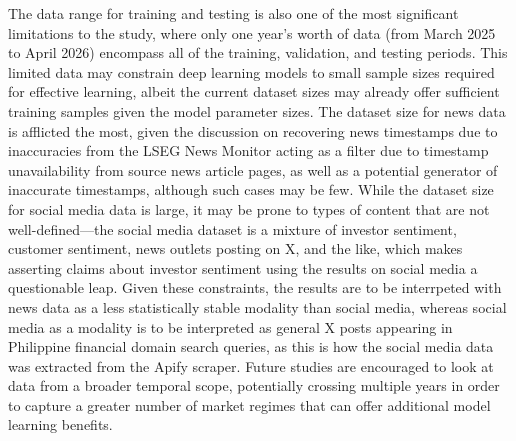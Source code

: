 \documentclass[stu,floatsintext]{apa7}
\begin{document}
The data range for training and testing is also one of the most significant limitations to the study, where only one year's worth of data (from March 2025 to April 2026) encompass all of the training, validation, and testing periods. This limited data may constrain deep learning models to small sample sizes required for effective learning, albeit the current dataset sizes may already offer sufficient training samples given the model parameter sizes. The dataset size for news data is afflicted the most, given the discussion on recovering news timestamps due to inaccuracies from the LSEG News Monitor acting as a filter due to timestamp unavailability from source news article pages, as well as a potential generator of inaccurate timestamps, although such cases may be few. While the dataset size for social media data is large, it may be prone to types of content that are not well-defined—the social media dataset is a mixture of investor sentiment, customer sentiment, news outlets posting on X, and the like, which makes asserting claims about investor sentiment using the results on social media a questionable leap. Given these constraints, the results are to be interrpeted with news data as a less statistically stable modality than social media, whereas social media as a modality is to be interpreted as general X posts appearing in Philippine financial domain search queries, as this is how the social media data was extracted from the Apify scraper. Future studies are encouraged to look at data from a broader temporal scope, potentially crossing multiple years in order to capture a greater number of market regimes that can offer additional model learning benefits.
\end{document}
